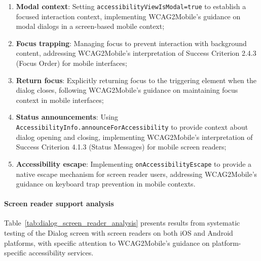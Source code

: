 \begin{enumerate}
    \item \textbf{Modal context}: Setting \texttt{accessibilityViewIsModal=true} to establish a focused interaction context, implementing WCAG2Mobile's guidance on modal dialogs in a screen-based mobile context;
    
    \item \textbf{Focus trapping}: Managing focus to prevent interaction with background content, addressing WCAG2Mobile's interpretation of Success Criterion 2.4.3 (Focus Order) for mobile interfaces;
    
    \item \textbf{Return focus}: Explicitly returning focus to the triggering element when the dialog closes, following WCAG2Mobile's guidance on maintaining focus context in mobile interfaces;
    
    \item \textbf{Status announcements}: Using \texttt{AccessibilityInfo.announceForAccessibility} to provide context about dialog opening and closing, implementing WCAG2Mobile's interpretation of Success Criterion 4.1.3 (Status Messages) for mobile screen readers;
    
    \item \textbf{Accessibility escape}: Implementing \texttt{onAccessibilityEscape} to provide a native escape mechanism for screen reader users, addressing WCAG2Mobile's guidance on keyboard trap prevention in mobile contexts.
\end{enumerate}

\paragraph{Screen reader support analysis}

Table~\ref{tab:dialog_screen_reader_analysis} presents results from systematic testing of the Dialog screen with screen readers on both iOS and Android platforms, with specific attention to WCAG2Mobile's guidance on platform-specific accessibility services.

